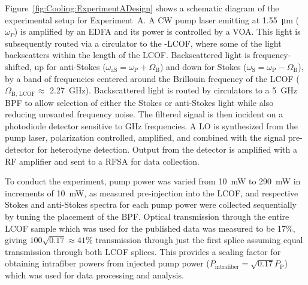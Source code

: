 Figure~\ref{fig:Cooling:ExperimentADesign} shows a schematic diagram of the experimental setup for Experiment~A. A \ac{CW} pump laser emitting at \SI{1.55}{\micro\meter} (\(\omega_{P}\)) is amplified by an \ac{EDFA} and its power is controlled by a \ac{VOA}. This light is subsequently routed via a circulator to the -\ac{LCOF}, where some of the light backscatters within the length of the \ac{LCOF}. Backscattered light is frequency-shifted, up for anti-Stokes (\(\omega_{\mathrm{aS}} = \omega_{\mathrm{P}} + \Omega_{\mathrm{B}}\)) and down for Stokes
(\(\omega_{\mathrm{S}} = \omega_{\mathrm{P}} - \Omega_{\mathrm{B}}\)),
by a band of frequencies centered around the Brillouin frequency of the \ac{LCOF} (\(\Omega_{\mathrm{B,\,LCOF}} \approx\) \SI{2.27}{\giga\hertz}). Backscattered light is routed by circulators to a \SI{5}{\giga\hertz} \ac{BPF} to allow selection of either the Stokes or anti-Stokes light while also reducing unwanted frequency noise. The filtered signal is then incident on a photodiode detector sensitive to \si{\giga\hertz} frequencies. A \ac{LO} is synthesized from the pump laser, polarization controlled, amplified, and combined with the signal pre-detector for heterodyne detection. Output from the detector is amplified with a \ac{RF} amplifier and sent to a \ac{RFSA} for data collection.

To conduct the experiment, pump power was varied from \SI{10}{\milli\watt} to \SI{290}{\milli\watt} in increments of \SI{10}{\milli\watt}, as measured pre-injection into the \ac{LCOF}, and respective Stokes and anti-Stokes spectra for each pump power were collected sequentially by tuning the placement of the \ac{BPF}. Optical transmission through the entire \ac{LCOF} sample which was used for the published data was measured to be 17\%, giving \(100\sqrt{0.17} \approx 41\%\) transmission through just the first splice assuming equal transmission through both \ac{LCOF} splices. This provides a scaling factor for obtaining intrafiber powers from injected pump power (\(P_{\mathrm{intrafiber}} = \sqrt{0.17}P_{\mathrm{P}}\)) which was used for data processing and analysis.

